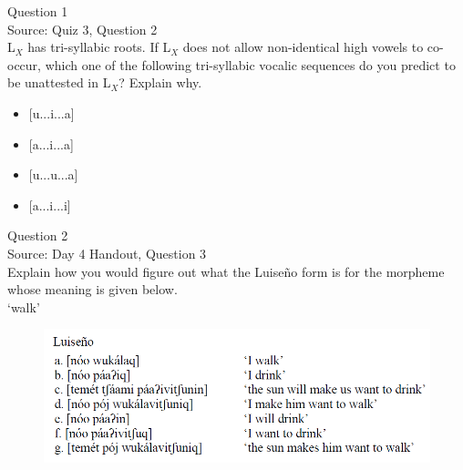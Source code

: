 \documentclass[12pt]{article}
\begin{document}
\begin{center}
\textbf{{\color{violet}{\HUGE Friday, 5 June 2020\\}}}

\textbf{{\color{violet}{\HUGE ALL EXAMS\\}}}

\end{center}
\newpage

\begin{center}
\textbf{{\color{blue}{\HUGE START OF EXAM\\}}}

\textbf{{\color{blue}{\HUGE Student ID: 6745\\}}}

\textbf{{\color{blue}{\HUGE 11:30 - 11:45 AM\\}}}

\end{center}
\newpage

{\large Question 1}\\

Source: Quiz 3, Question 2\\

L$_X$ has tri-syllabic roots. If L$_X$ does not allow non-identical high vowels to co-occur, which one of the following tri-syllabic vocalic sequences do you predict to be unattested in L$_X$? Explain why.\\

\begin{itemize} \item {[u...i...a]} \item {[a...i...a]} \item {[u...u...a]} \item {[a...i...i]} \end{itemize}


\newpage

{\large Question 2}\\

Source: Day 4 Handout, Question 3\\

Explain how you would figure out what the Luiseño form is for the morpheme whose meaning is given below.\\

‘walk’

\begin{figure}[H]
\includegraphics{../images/luiseno.png}
\end{figure}
\end{document}
